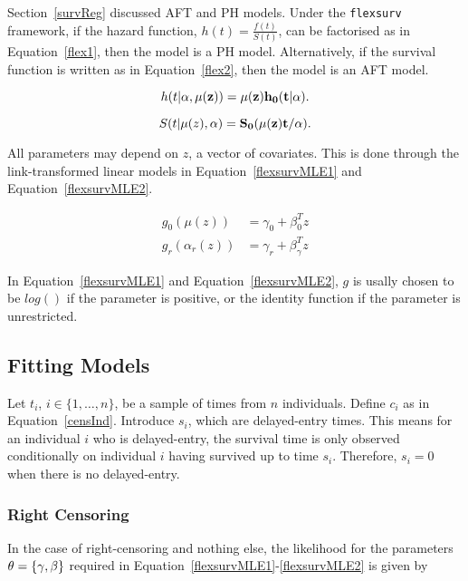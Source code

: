 Section~\ref{survReg} discussed AFT and PH models. Under the \verb|flexsurv| framework, if the hazard function, $h(t) = \frac{f(t)}{S(t)}$, can be factorised as in Equation~\ref{flex1}, then the model is a PH model. Alternatively, if the survival function is written as in Equation~\ref{flex2}, then the model is an AFT model.

\begin{equation}
    h(t|\bf{\alpha}, \mu(z)) = \mu(z)h_0(t|\alpha). 
    \label{flex1}
\end{equation}

\begin{equation}
    S(t|\mu(z), \bf{\alpha}) = S_0(\mu(z)t/\alpha).  
    \label{flex2}
\end{equation}

All parameters may depend on $z$, a vector of covariates. This is done through the link-transformed linear models in Equation~\ref{flexsurvMLE1} and Equation~\ref{flexsurvMLE2}.

\begin{align}
    g_0(\mu(z)) &= \gamma_0 + \beta_0^Tz \label{flexsurvMLE1}\\
    g_r(\alpha_r(z)) &= \gamma_r + \beta_{\gamma}^Tz \label{flexsurvMLE2}
\end{align}

In Equation~\ref{flexsurvMLE1} and Equation~\ref{flexsurvMLE2}, $g$ is usally chosen to be $log()$ if the parameter is positive, or the identity function if the parameter is unrestricted.

\subsection{Fitting Models}
Let $t_i$, $i \in \{1, \ldots, n\}$, be a sample of times from $n$ individuals. Define $c_i$ as in Equation~\ref{censInd}. Introduce $s_i$, which are delayed-entry times. This means for an individual $i$ who is delayed-entry, the survival time is only observed conditionally on individual $i$ having survived up to time $s_i$. Therefore, $s_i = 0$ when there is no delayed-entry. 

\subsubsection{Right Censoring}
In the case of right-censoring and nothing else, the likelihood for the parameters $\bf{\theta} = \{\bf{\gamma}, \bf{\beta}\}$ required in Equation~\ref{flexsurvMLE1}-\ref{flexsurvMLE2} is given by 

